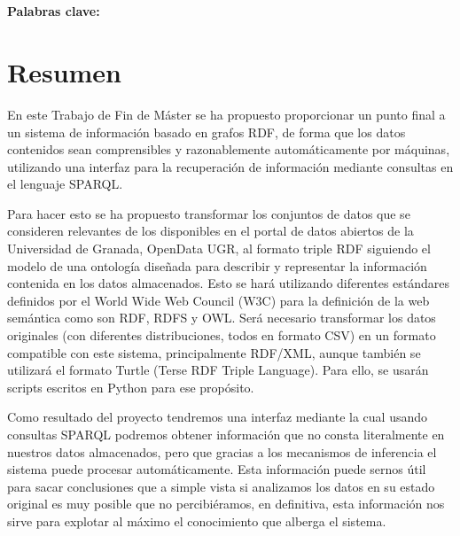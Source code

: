 \begin{center}
{\LARGE\bfseries\titulo}\\
\end{center}
\begin{center}
\autor\
\end{center}

\textbf{Palabras clave: }{\keywordsEs}

\section*{Resumen}

En este {\sf Trabajo de Fin de Máster} se ha propuesto proporcionar un punto final a un sistema de información basado en grafos {\sf RDF}, de forma que los datos contenidos sean comprensibles y razonablemente automáticamente por máquinas, utilizando una interfaz para la recuperación de información mediante consultas en el lenguaje {\sf SPARQL}. 

\bigskip
Para hacer esto se ha propuesto transformar los conjuntos de datos que se consideren relevantes de los disponibles en el portal de datos abiertos de la {Universidad de Granada}, {\sf OpenData UGR}, al formato triple RDF siguiendo el modelo de una ontología diseñada para describir y representar la información contenida en los datos almacenados. Esto se hará utilizando diferentes estándares definidos por el {\sf World Wide Web Council (W3C)} para la definición de la web semántica como son {\sf RDF}, {\sf RDFS} y {\sf OWL}. Será necesario transformar los datos originales (con diferentes distribuciones, todos en formato {\sf CSV}) en un formato compatible con este sistema, principalmente {\sf RDF/XML}, aunque también se utilizará el formato {\sf Turtle (Terse RDF Triple Language)}. Para ello, se usarán scripts escritos en {\sf Python} para ese propósito.

\bigskip
Como resultado del proyecto tendremos una interfaz mediante la cual usando consultas {\sf SPARQL} podremos obtener información que no consta literalmente en nuestros datos almacenados, pero que gracias a los mecanismos de inferencia el sistema puede procesar automáticamente. Esta información puede sernos útil para sacar conclusiones que a simple vista si analizamos los datos en su estado original es muy posible que no percibiéramos, en definitiva, esta información nos sirve para explotar al máximo el conocimiento que alberga el sistema.

\newpage
\begin{center}
{\LARGE\bfseries\tituloEng}\\
\end{center}
\begin{center}
\autor\
\end{center}

